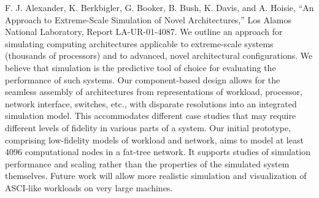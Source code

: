 \documentclass[]{article}
\begin{document}
F. J. Alexander, K. Berkbigler, G. Booker, B. Bush, K. Davis, and A.
Hoisie, ``An Approach to Extreme-Scale Simulation of Novel
Architectures,'' Los Alamos National Laboratory, Report LA-UR-01-4087.
We outline an approach for simulating computing architectures applicable
to extreme-scale systems (thousands of processors) and to advanced,
novel architectural configurations. We believe that simulation is the
predictive tool of choice for evaluating the performance of such
systems. Our component-based design allows for the seamless assembly of
architectures from representations of workload, processor, network
interface, switches, etc., with disparate resolutions into an integrated
simulation model. This accommodates different case studies that may
require different levels of fidelity in various parts of a system. Our
initial prototype, comprising low-fidelity models of workload and
network, aims to model at least 4096 computational nodes in a fat-tree
network. It supports studies of simulation performance and scaling
rather than the properties of the simulated system themselves. Future
work will allow more realistic simulation and visualization of ASCI-like
workloads on very large machines.
\end{document}
